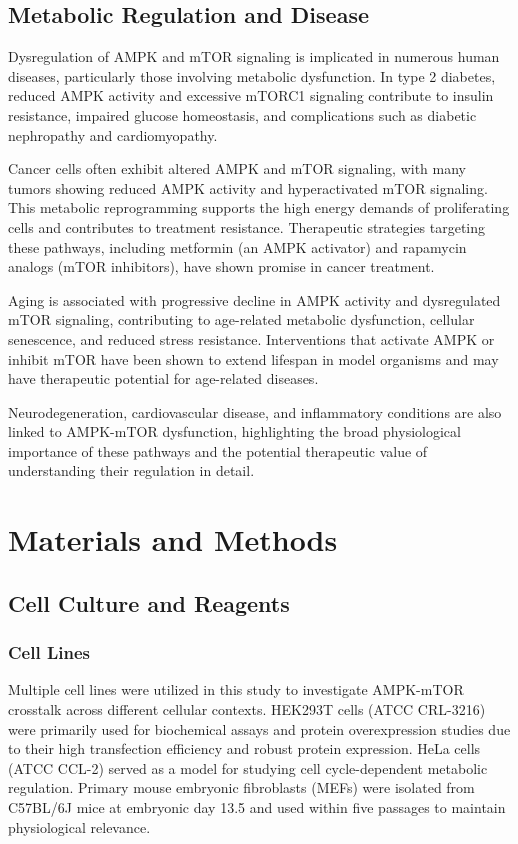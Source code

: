 \documentclass[11pt,a4paper]{article}
\begin{document}
\subsection{Metabolic Regulation and Disease}

Dysregulation of AMPK and mTOR signaling is implicated in numerous human diseases, particularly those involving metabolic dysfunction. In type 2 diabetes, reduced AMPK activity and excessive mTORC1 signaling contribute to insulin resistance, impaired glucose homeostasis, and complications such as diabetic nephropathy and cardiomyopathy.

Cancer cells often exhibit altered AMPK and mTOR signaling, with many tumors showing reduced AMPK activity and hyperactivated mTOR signaling. This metabolic reprogramming supports the high energy demands of proliferating cells and contributes to treatment resistance. Therapeutic strategies targeting these pathways, including metformin (an AMPK activator) and rapamycin analogs (mTOR inhibitors), have shown promise in cancer treatment.

Aging is associated with progressive decline in AMPK activity and dysregulated mTOR signaling, contributing to age-related metabolic dysfunction, cellular senescence, and reduced stress resistance. Interventions that activate AMPK or inhibit mTOR have been shown to extend lifespan in model organisms and may have therapeutic potential for age-related diseases.

Neurodegeneration, cardiovascular disease, and inflammatory conditions are also linked to AMPK-mTOR dysfunction, highlighting the broad physiological importance of these pathways and the potential therapeutic value of understanding their regulation in detail.

\section{Materials and Methods}

\subsection{Cell Culture and Reagents}

\subsubsection{Cell Lines}

Multiple cell lines were utilized in this study to investigate AMPK-mTOR crosstalk across different cellular contexts. HEK293T cells (ATCC CRL-3216) were primarily used for biochemical assays and protein overexpression studies due to their high transfection efficiency and robust protein expression. HeLa cells (ATCC CCL-2) served as a model for studying cell cycle-dependent metabolic regulation. Primary mouse embryonic fibroblasts (MEFs) were isolated from C57BL/6J mice at embryonic day 13.5 and used within five passages to maintain physiological relevance.
\end{document}
